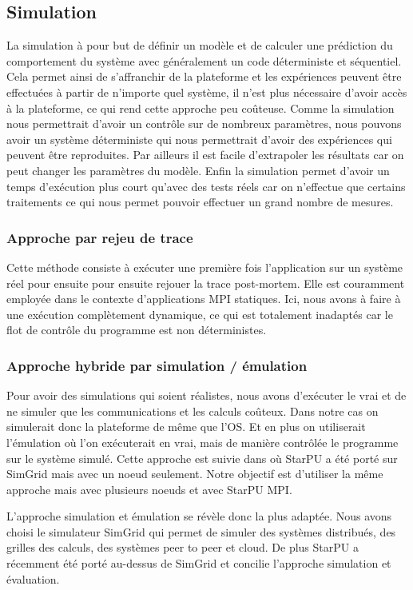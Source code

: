 \documentclass[smallextended]{svjour3}
\begin{document}
\subsection{Simulation}
\label{sec-2-2}
La simulation à pour but de définir un modèle et de calculer une
prédiction du comportement du système avec généralement un code
déterministe et séquentiel. Cela permet ainsi de s'affranchir de la
plateforme et les expériences peuvent être effectuées à partir de
n'importe quel système, il n'est plus nécessaire d'avoir accès à la
plateforme, ce qui rend cette approche peu coûteuse. Comme la 
simulation nous permettrait d'avoir un contrôle sur de nombreux
paramètres, nous pouvons avoir un système déterministe qui 
nous permettrait d'avoir des expériences qui peuvent être reproduites. 
Par ailleurs il est facile d'extrapoler les résultats car on peut
changer les paramètres du modèle. Enfin la simulation
permet d'avoir un temps d'exécution plus court qu'avec des tests
réels car on n'effectue que certains traitements ce qui nous permet
pouvoir effectuer un grand nombre de mesures.  

\subsubsection{Approche par rejeu de trace}
\label{sec-2-2-1}
Cette méthode consiste à exécuter une première fois l'application
sur un système réel pour ensuite pour ensuite rejouer la trace
post-mortem. Elle est couramment employée dans le contexte 
d'applications MPI statiques. Ici, nous avons à faire à une
exécution complètement dynamique, ce qui est totalement inadaptés car
le flot de contrôle du programme est non déterministes. 
\subsubsection{Approche hybride par simulation / émulation}
\label{sec-2-2-2}
Pour avoir des simulations qui soient réalistes, nous avons
d'exécuter le vrai et de ne simuler que les communications et les
calculs coûteux. Dans notre cas on simulerait donc la plateforme de
même que l'OS. Et en plus on utiliserait l'émulation où l'on
exécuterait en vrai, mais de manière contrôlée le programme sur le
système simulé. Cette approche est suivie dans \cite{StarPUSG} où
StarPU a été porté sur SimGrid mais avec un noeud seulement. Notre
objectif est d'utiliser la même approche mais avec plusieurs
noeuds et avec StarPU MPI. 

L'approche simulation et émulation se révèle donc la plus adaptée.
Nous avons choisi le simulateur SimGrid qui permet de simuler des
systèmes distribués, des grilles des calculs, des systèmes peer to
peer et cloud. De plus StarPU a récemment été porté au-dessus de
SimGrid et concilie l'approche simulation et évaluation.
\end{document}
